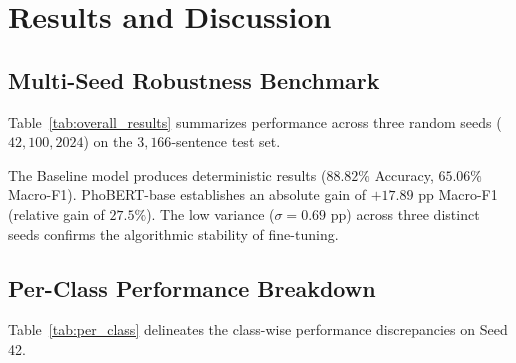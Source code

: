 \documentclass[conference]{IEEEtran}
\begin{document}
\section{Results and Discussion}
\subsection{Multi-Seed Robustness Benchmark}
Table~\ref{tab:overall_results} summarizes performance across three random seeds ($42, 100, 2024$) on the $3,166$-sentence test set.

\begin{table}[!htbp]
\caption{Performance on UIT-VSFC Test Set Across Random Seeds}
\label{tab:overall_results}
\centering
{}
\end{table}

The Baseline model produces deterministic results ($88.82\%$ Accuracy, $65.06\%$ Macro-F1). PhoBERT-base establishes an absolute gain of $+17.89\text{ pp}$ Macro-F1 (relative gain of $27.5\%$). The low variance ($\sigma = 0.69\text{ pp}$) across three distinct seeds confirms the algorithmic stability of fine-tuning.

\subsection{Per-Class Performance Breakdown}
Table~\ref{tab:per_class} delineates the class-wise performance discrepancies on Seed 42.
\end{document}
